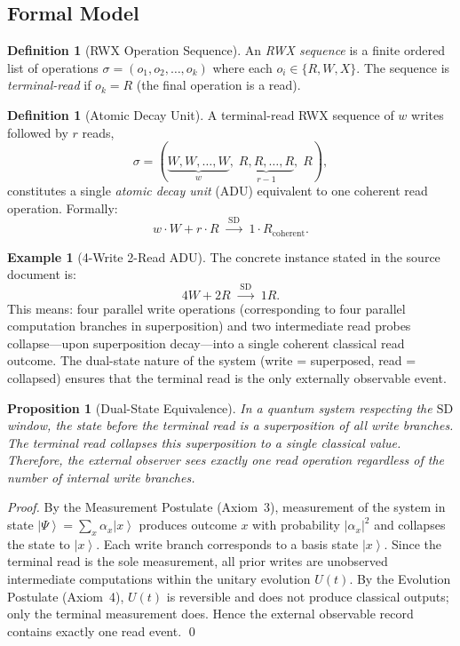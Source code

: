 \documentclass[11pt]{article}
\theoremstyle{plain}
\newtheorem{proposition}[theorem]{Proposition}
\theoremstyle{definition}
\newtheorem{definition}[theorem]{Definition}
\newtheorem{example}[theorem]{Example}
\theoremstyle{remark}
\newcommand{\ket}[1]{\left| #1 \right\rangle}
\newcommand{\SD}{\ensuremath{\mathrm{SD}}}   %
\begin{document}
\subsection{Formal Model}

\begin{definition}[RWX Operation Sequence]
  An \emph{RWX sequence} is a finite ordered list of operations
  $\sigma = (o_1, o_2, \ldots, o_k)$ where each $o_i \in \{R, W, X\}$.
  The sequence is \emph{terminal-read} if $o_k = R$ (the final operation is
  a read).
\end{definition}

\begin{definition}[Atomic Decay Unit]
  \label{def:adu}
  A terminal-read RWX sequence of $w$ writes followed by $r$ reads,
  \[
    \sigma = (\underbrace{W, W, \ldots, W}_{w},\;
              \underbrace{R, R, \ldots, R}_{r-1},\; R),
  \]
  constitutes a single \emph{atomic decay unit} (ADU) equivalent to one
  coherent read operation.  Formally:
  \[
    w \cdot W + r \cdot R \;\xrightarrow{\;\SD\;}\; 1 \cdot R_{\text{coherent}}.
  \]
\end{definition}

\begin{example}[4-Write 2-Read ADU]
  The concrete instance stated in the source document is:
  \[
    4W + 2R \;\xrightarrow{\;\SD\;}\; 1R.
  \]
  This means: four parallel write operations (corresponding to four parallel
  computation branches in superposition) and two intermediate read probes
  collapse---upon superposition decay---into a single coherent classical read
  outcome.  The dual-state nature of the system (write = superposed,
  read = collapsed) ensures that the terminal read is the only externally
  observable event.
\end{example}

\begin{proposition}[Dual-State Equivalence]
  In a quantum system respecting the \SD{} window, the state before the
  terminal read is a superposition of all write branches.  The terminal read
  collapses this superposition to a single classical value.  Therefore, the
  external observer sees exactly one read operation regardless of the number
  of internal write branches.
\end{proposition}

\begin{proof}
  By the Measurement Postulate (Axiom~3), measurement of the system in state
  $\ket{\Psi} = \sum_x \alpha_x \ket{x}$ produces outcome $x$ with
  probability $|\alpha_x|^2$ and collapses the state to $\ket{x}$.  Each
  write branch corresponds to a basis state $\ket{x}$.  Since the terminal
  read is the sole measurement, all prior writes are unobserved intermediate
  computations within the unitary evolution $U(t)$.  By the Evolution
  Postulate (Axiom~4), $U(t)$ is reversible and does not produce classical
  outputs; only the terminal measurement does.  Hence the external observable
  record contains exactly one read event. \qed
\end{proof}
\end{document}
